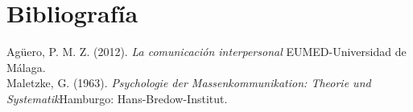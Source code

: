 \documentclass[a4paper,11pt]{article}
\begin{document}
\section*{Bibliografía}
Agüero, P. M. Z. (2012). \textit{La comunicación interpersonal} EUMED-Universidad de Málaga.\\
Maletzke, G. (1963). \textit{Psychologie der Massenkommunikation: Theorie und Systematik}Hamburgo: Hans-Bredow-Institut. 
\end{document}
